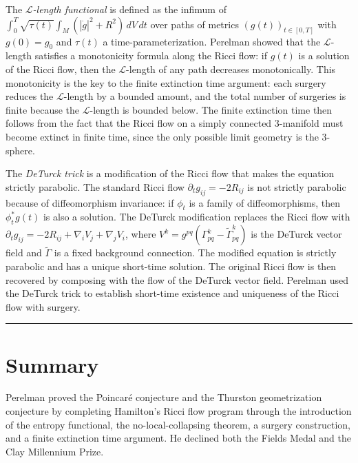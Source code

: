 The \emph{$\mathcal{L}$-length functional} is defined as the infimum of $\int_0^T \sqrt{\tau(t)} \int_M (|\dot{g}|^2 + R^2) \, dV \, dt$ over paths of metrics $(g(t))_{t \in [0,T]}$ with $g(0) = g_0$ and $\tau(t)$ a time-parameterization. Perelman showed that the $\mathcal{L}$-length satisfies a monotonicity formula along the Ricci flow: if $g(t)$ is a solution of the Ricci flow, then the $\mathcal{L}$-length of any path decreases monotonically. This monotonicity is the key to the finite extinction time argument: each surgery reduces the $\mathcal{L}$-length by a bounded amount, and the total number of surgeries is finite because the $\mathcal{L}$-length is bounded below. The finite extinction time then follows from the fact that the Ricci flow on a simply connected 3-manifold must become extinct in finite time, since the only possible limit geometry is the 3-sphere.

The \emph{DeTurck trick} is a modification of the Ricci flow that makes the equation strictly parabolic. The standard Ricci flow $\partial_t g_{ij} = -2R_{ij}$ is not strictly parabolic because of diffeomorphism invariance: if $\phi_t$ is a family of diffeomorphisms, then $\phi_t^* g(t)$ is also a solution. The DeTurck modification replaces the Ricci flow with $\partial_t g_{ij} = -2R_{ij} + \nabla_i V_j + \nabla_j V_i$, where $V^k = g^{pq}(\Gamma^k_{pq} - \tilde{\Gamma}^k_{pq})$ is the DeTurck vector field and $\tilde{\Gamma}$ is a fixed background connection. The modified equation is strictly parabolic and has a unique short-time solution. The original Ricci flow is then recovered by composing with the flow of the DeTurck vector field. Perelman used the DeTurck trick to establish short-time existence and uniqueness of the Ricci flow with surgery.

\begin{center}\rule{0.5\linewidth}{0.5pt}\end{center}

\section*{Summary}

Perelman proved the Poincar\'e conjecture and the Thurston geometrization conjecture by completing Hamilton's Ricci flow program through the introduction of the entropy functional, the no-local-collapsing theorem, a surgery construction, and a finite extinction time argument. He declined both the Fields Medal and the Clay Millennium Prize.
